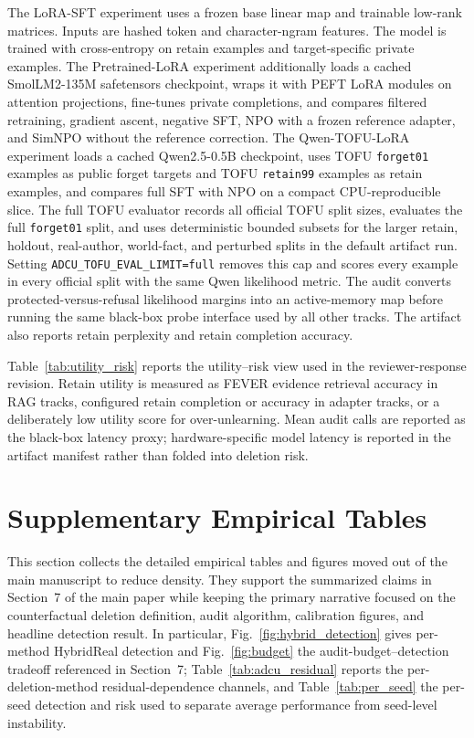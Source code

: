 The LoRA-SFT experiment uses a frozen base linear map and trainable low-rank matrices. Inputs are hashed token and character-ngram features. The model is trained with cross-entropy on retain examples and target-specific private examples. The Pretrained-LoRA experiment additionally loads a cached SmolLM2-135M safetensors checkpoint, wraps it with PEFT LoRA modules on attention projections, fine-tunes private completions, and compares filtered retraining, gradient ascent, negative SFT, NPO with a frozen reference adapter, and SimNPO without the reference correction. The Qwen-TOFU-LoRA experiment loads a cached Qwen2.5-0.5B checkpoint, uses TOFU \texttt{forget01} examples as public forget targets and TOFU \texttt{retain99} examples as retain examples, and compares full SFT with NPO on a compact CPU-reproducible slice. The full TOFU evaluator records all official TOFU split sizes, evaluates the full \texttt{forget01} split, and uses deterministic bounded subsets for the larger retain, holdout, real-author, world-fact, and perturbed splits in the default artifact run. Setting \texttt{ADCU\_TOFU\_EVAL\_LIMIT=full} removes this cap and scores every example in every official split with the same Qwen likelihood metric. The audit converts protected-versus-refusal likelihood margins into an active-memory map before running the same black-box probe interface used by all other tracks. The artifact also reports retain perplexity and retain completion accuracy.



Table~\ref{tab:utility_risk} reports the utility--risk view used in the reviewer-response revision. Retain utility is measured as FEVER evidence retrieval accuracy in RAG tracks, configured retain completion or accuracy in adapter tracks, or a deliberately low utility score for over-unlearning. Mean audit calls are reported as the black-box latency proxy; hardware-specific model latency is reported in the artifact manifest rather than folded into deletion risk.

\section{Supplementary Empirical Tables}

This section collects the detailed empirical tables and figures moved out of the main manuscript to reduce density. They support the summarized claims in Section~7 of the main paper while keeping the primary narrative focused on the counterfactual deletion definition, audit algorithm, calibration figures, and headline detection result. In particular, Fig.~\ref{fig:hybrid_detection} gives per-method HybridReal detection and Fig.~\ref{fig:budget} the audit-budget--detection tradeoff referenced in Section~7; Table~\ref{tab:adcu_residual} reports the per-deletion-method residual-dependence channels, and Table~\ref{tab:per_seed} the per-seed detection and risk used to separate average performance from seed-level instability.

